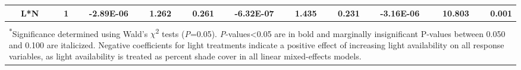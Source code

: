 \begin{landscape}
\begin{table}[]
{\begin{tabular}{p{0.5cm}p{2.5cm}p{0.5cm}p{2cm}p{1.5cm}p{1.5cm}p{2cm}p{1.5cm}p{1.5cm}p{2cm}p{1.5cm}p{1.5cm}}
         & L*N                  
         & \multicolumn{1}{r}{1}
         & \multicolumn{1}{r}{-2.89E-06}            
         & \multicolumn{1}{r}{1.262}                            
         & \multicolumn{1}{r}{0.261}                
         & \multicolumn{1}{r}{-6.32E-07}            
         & \multicolumn{1}{r}{ 1.435}                            
         & \multicolumn{1}{r}{0.231}                
         & \multicolumn{1}{r}{-3.16E-06}            
         & \multicolumn{1}{r}{10.803}                            
         & \multicolumn{1}{r}{\textbf{0.001}} \\ 
         \hline 
         \\
         \multicolumn{12}{p{22.5cm}}{\textsuperscript{$*$}Significance determined using Wald’s $\chi$\textsuperscript{2} tests (\textit{P}=0.05). \textit{P}-values<0.05 are in bold and marginally insignificant P-values between 0.050 and 0.100 are italicized. Negative coefficients for light treatments indicate a positive effect of increasing light availability on all response variables, as light availability is treated as percent shade cover in all linear mixed-effects models.}
\end{tabular}%
}
\end{table}
\end{landscape}
\clearpage


